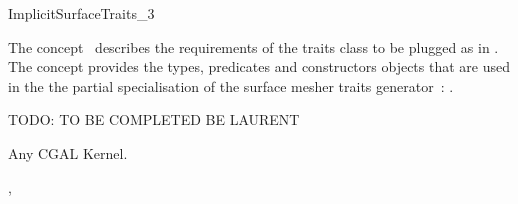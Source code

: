 

\begin{ccRefConcept}{ImplicitSurfaceTraits_3}


\ccDefinition
  
The concept \ccRefName\  describes the requirements of the traits class to
be plugged  as  in .
The concept provides the types, predicates and constructors objects
that are  used in the 
the partial specialisation  of 
the  surface mesher traits generator~:
.



TODO: TO BE COMPLETED BE LAURENT



\ccTypes

\ccGlue
{}
\ccGlue
{}






\ccHasModels

Any CGAL Kernel.


\ccSeeAlso

,\\






\end{ccRefConcept}


